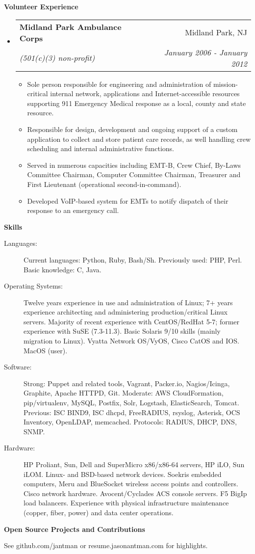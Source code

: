 \documentclass[letterpaper,11pt]{article}
\makeatletter
\newcommand{\resitem}[1]{\item #1 \vspace{-2pt}}
\newcommand{\resheading}[1]{{\large \colorbox{mygrey}{\begin{minipage}{\textwidth}{\textbf{#1 \vphantom{p\^{E}}}}\end{minipage}}}}
\newcommand{\ressubheading}[4]{
\begin{tabular*}{7.0in}{l@{\extracolsep{\fill}}r}
		\textbf{#1} & #2 \\
		\textit{#3} & \textit{#4} \\
\end{tabular*}\vspace{-6pt}}
\makeatother
\begin{document}
\resheading{Volunteer Experience}
\begin{itemize}
\item
        \ressubheading{Midland Park Ambulance Corps}{Midland Park, NJ}{(501(c)(3) non-profit)}{January 2006 - January 2012}
        \begin{itemize}
                \resitem{Sole person responsible for engineering and administration of
                  mission-critical internal network, applications and
                  Internet-accessible resources supporting 911 Emergency
                  Medical response as a local, county and state resource.}
                \resitem{Responsible for design, development and ongoing support of a custom application to
                  collect and store patient care records, as well handling crew scheduling and internal
                  administrative functions.}
                \resitem{Served in numerous capacities including EMT-B, Crew Chief,
                  By-Laws Committee Chairman, Computer Committee Chairman,
                  Treasurer and First Lieutenant (operational second-in-command).}
                \resitem{Developed VoIP-based system for EMTs to notify
                  dispatch of their response to an emergency call.}
        \end{itemize}
\end{itemize}

\resheading{Skills}

\begin{description}
\item[Languages:]
Current languages: Python, Ruby, Bash/Sh. Previously used: PHP, Perl. Basic knowledge: C, Java.
\item[Operating Systems:]
Twelve years experience in use and administration of Linux; 7+ years experience architecting and administering production/critical Linux servers.
Majority of recent experience with CentOS/RedHat 5-7; former experience with SuSE
(7.3-11.3). Basic Solaris 9/10 skills (mainly migration to Linux). Vyatta Network OS/VyOS, Cisco CatOS and IOS. MacOS (user).
\item[Software:]
Strong: Puppet and related tools, Vagrant, Packer.io, Nagios/Icinga, Graphite, Apache HTTPD, Git.
Moderate: AWS CloudFormation, pip/virtualenv, MySQL, Postfix, Solr, Logstash, ElasticSearch, Tomcat.
Previous: ISC BIND9, ISC dhcpd, FreeRADIUS, rsyslog, Asterisk, OCS Inventory, OpenLDAP, memcached. Protocols: RADIUS, DHCP, DNS, SNMP.

\item[Hardware:]
HP Proliant, Sun, Dell and SuperMicro x86/x86-64 servers, HP iLO, Sun iLOM. Linux- and
BSD-based network devices. Soekris embedded computers, Meru and BlueSocket
wireless access points and controllers. Cisco network hardware. Avocent/Cyclades ACS console servers. F5 BigIp load balancers. Experience with physical infrastructure maintenance (copper, fiber, power) and data center operations.
\end{description}

\resheading{Open Source Projects and Contributions}
\begin{description}
\item{See github.com/jantman or resume.jasonantman.com for highlights.}
\end{description}
\end{document}
